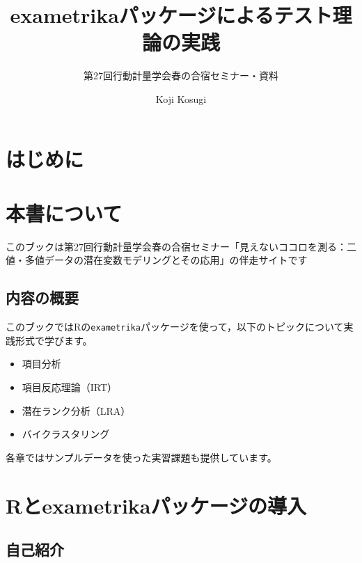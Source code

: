 \documentclass[
  a4paper,
]{ltjsbook}
\title{exametrikaパッケージによるテスト理論の実践}
\subtitle{第27回行動計量学会春の合宿セミナー・資料}
\author{Koji Kosugi}
\date{}
\providecommand{\tightlist}{%
  \setlength{\itemsep}{0pt}\setlength{\parskip}{0pt}}\usepackage{longtable,booktabs,array}
\renewcommand*\contentsname{Table of contents}
\newcommand\contentsname{Table of contents}
\begin{document}
\maketitle

\renewcommand*\contentsname{Table of contents}
{
\hypersetup{linkcolor=}
\setcounter{tocdepth}{2}
\tableofcontents
}


\chapter{はじめに}\label{ux306fux3058ux3081ux306b}


\chapter{本書について}\label{ux672cux66f8ux306bux3064ux3044ux3066}

このブックは第27回行動計量学会春の合宿セミナー「見えないココロを測る：二値・多値データの潜在変数モデリングとその応用」の伴走サイトです

\section{内容の概要}\label{ux5185ux5bb9ux306eux6982ux8981}

このブックではRの\texttt{exametrika}パッケージを使って，以下のトピックについて実践形式で学びます。

\begin{itemize}
\tightlist
\item
  項目分析
\item
  項目反応理論（IRT）
\item
  潜在ランク分析（LRA）
\item
  バイクラスタリング
\end{itemize}

各章ではサンプルデータを使った実習課題も提供しています。


\chapter{Rとexametrikaパッケージの導入}\label{rux3068exametrikaux30d1ux30c3ux30b1ux30fcux30b8ux306eux5c0eux5165}

\section{自己紹介}\label{ux81eaux5df1ux7d39ux4ecb}
\end{document}
